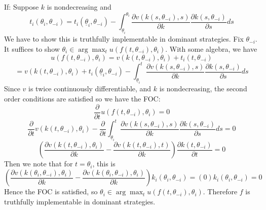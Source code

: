 \documentclass[10pt,letter]{article}
\begin{document}
If: Suppose $k$ is nondecreasing and
\[ t_i(\theta_i, \theta_{-i}) = t_i(\underline{\theta}_i, \theta_{-i}) - \int_{\underline{\theta}_i}^{\theta_i}\frac{\partial v(k(s,\theta_{-i}),s)}{\partial k} \frac{\partial k(s, \theta_{-i})}{\partial s} ds \]
We have to show this is truthfully implementable in dominant strategies. Fix $\theta_{-i}$. It suffices to show $\theta_i \in \arg\max_t u(f(t, \theta_{-i}), \theta_i)$. With some algebra, we have
\[ u(f(t, \theta_{-i}), \theta_i) = v(k(t, \theta_{-i}), \theta_i) + t_i(t, \theta_{-i})\]
\[ = v(k(t, \theta_{-i}), \theta_i) + t_i(\underline{\theta}_i, \theta_{-i}) - \int_{\underline{\theta}_i}^{t}\frac{\partial v(k(s,\theta_{-i}),s)}{\partial k} \frac{\partial k(s, \theta_{-i})}{\partial s} ds \]
Since $v$ is twice continuously differentiable, and $k$ is nondecreasing, the second order conditions are satisfied so we have the FOC:
\[ \frac{\partial}{\partial t}u(f(t, \theta_{-i}), \theta_i) = 0 \]
\[ \frac{\partial}{\partial t}v(k(t, \theta_{-i}), \theta_i) - \frac{\partial}{\partial t}\int_{\underline{\theta}_i}^{t}\frac{\partial v(k(s,\theta_{-i}),s)}{\partial k} \frac{\partial k(s, \theta_{-i})}{\partial s} ds = 0 \]
\[ \left(\frac{\partial v(k(t, \theta_{-i}), \theta_i)}{\partial k}  - \frac{\partial v(k(t,\theta_{-i}),t)}{\partial k}\right) \frac{\partial k(t, \theta_{-i})}{\partial t} = 0  \]
Then we note that for $t = \theta_i$, this is
\[ \left(\frac{\partial v(k(\theta_i, \theta_{-i}), \theta_i)}{\partial k}  - \frac{\partial v(k(\theta_i,\theta_{-i}),\theta_i)}{\partial k}\right) k_i(\theta_i, \theta_{-i}) = (0)k_i(\theta_i, \theta_{-i}) = 0  \]
Hence the FOC is satisfied, so $\theta_i \in \arg\max_t u(f(t, \theta_{-i}), \theta_i)$. Therefore $f$ is truthfully implementable in dominant strategies.
\end{document}
